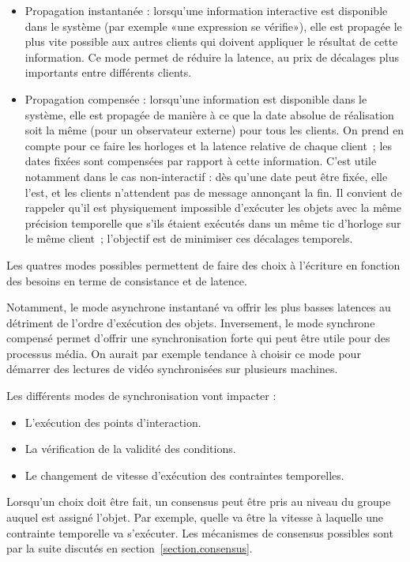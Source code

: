 \documentclass{article}
\newcommand\triggers{points d'interaction\xspace}
\begin{document}
\begin{itemize}
	\item Propagation instantanée : lorsqu'une information interactive est disponible dans le système (par exemple «une expression se vérifie»), elle est propagée le plus vite possible aux autres clients qui doivent appliquer le résultat de cette information. 
    Ce mode permet de réduire la latence, au prix de décalages plus importants entre différents clients.
	\item Propagation compensée : lorsqu'une information est disponible dans le système, elle est propagée de manière à ce que la date absolue de réalisation soit la même (pour un observateur externe) pour tous les clients. 
	On prend en compte pour ce faire les horloges et la latence relative de chaque client~; les dates fixées sont compensées par rapport à cette information.
	C'est utile notamment dans le cas non-interactif : dès qu'une date peut être fixée, elle l'est, et les clients n'attendent pas de message annonçant la fin. 
	Il convient de rappeler qu'il est physiquement impossible d'exécuter les objets avec la même précision temporelle que s'ils étaient exécutés dans un même tic d'horloge sur le même client~; l'objectif est de minimiser ces décalages temporels.
\end{itemize}

Les quatres modes possibles permettent de faire des choix à l'écriture en fonction des besoins en terme de consistance et de latence.

Notamment, le mode asynchrone instantané va offrir les plus basses latences au détriment de l'ordre d'exécution des objets.
Inversement, le mode synchrone compensé permet d'offrir une synchronisation forte qui peut être utile pour des processus média. 
On aurait par exemple tendance à choisir ce mode pour démarrer des lectures de vidéo synchronisées sur plusieurs machines.

Les différents modes de synchronisation vont impacter : 
\begin{itemize}
    \item L'exécution des \triggers.
    \item La vérification de la validité des conditions.
    \item Le changement de vitesse d'exécution des contraintes temporelles.
\end{itemize}

Lorsqu'un choix doit être fait, un consensus peut être pris au niveau du groupe auquel est assigné l'objet. 
Par exemple, quelle va être la vitesse à laquelle une contrainte temporelle va s'exécuter.
Les mécanismes de consensus possibles sont par la suite discutés en section~\ref{section.consensus}.
\end{document}
